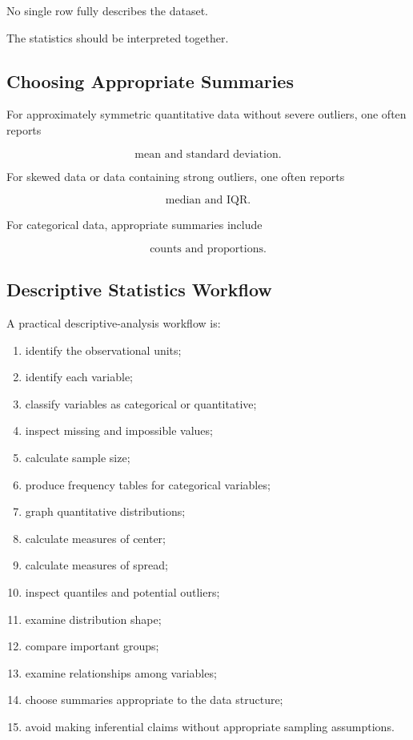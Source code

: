 No single row fully describes the dataset.

The statistics should be interpreted together.

\subsection{Choosing Appropriate Summaries}
\label{subsec:choosing-summaries}

For approximately symmetric quantitative data without severe outliers,
one often reports

\[
\boxed{
\text{mean and standard deviation}.
}
\]

For skewed data or data containing strong outliers, one often reports

\[
\boxed{
\text{median and IQR}.
}
\]

For categorical data, appropriate summaries include

\[
\boxed{
\text{counts and proportions}.
}
\]

\subsection{Descriptive Statistics Workflow}
\label{subsec:descriptive-statistics-workflow}

A practical descriptive-analysis workflow is:

\begin{enumerate}
    \item identify the observational units;
    \item identify each variable;
    \item classify variables as categorical or quantitative;
    \item inspect missing and impossible values;
    \item calculate sample size;
    \item produce frequency tables for categorical variables;
    \item graph quantitative distributions;
    \item calculate measures of center;
    \item calculate measures of spread;
    \item inspect quantiles and potential outliers;
    \item examine distribution shape;
    \item compare important groups;
    \item examine relationships among variables;
    \item choose summaries appropriate to the data structure;
    \item avoid making inferential claims without appropriate sampling
          assumptions.
\end{enumerate}

